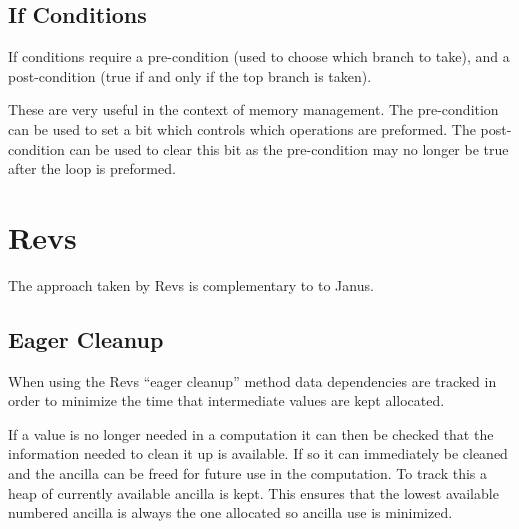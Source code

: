 \subsection{If Conditions}
If conditions require a pre-condition (used to choose which branch to take),
and a post-condition (true if and only if the top branch is taken).

These are very useful in the context of memory management.
The pre-condition can be used to set a bit which controls which operations are preformed.
The post-condition can be used to clear this bit as the pre-condition may no longer be true after the loop is preformed.

\section{Revs}
The approach taken by Revs is complementary to to Janus.

\subsection{Eager Cleanup}
When using the Revs ``eager cleanup'' method data dependencies are tracked in order to minimize the time that intermediate values are kept allocated.

If a value is no longer needed in a computation it can then be checked that the information needed to clean it up is available.
If so it can immediately be cleaned and the ancilla can be freed for future use in the computation.
To track this a heap of currently available ancilla is kept.
This ensures that the lowest available numbered ancilla is always the one allocated so ancilla use is minimized.
